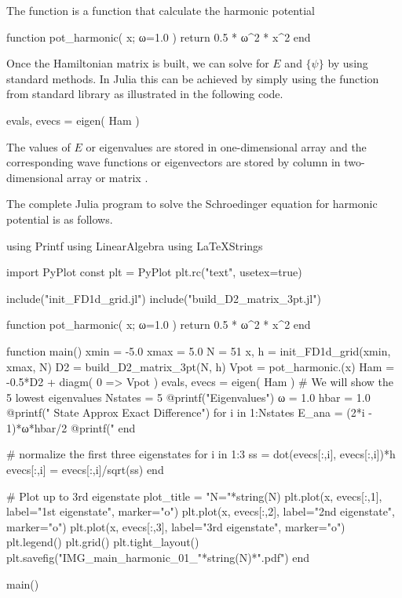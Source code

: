 The function  is a function that calculate the harmonic potential
\begin{juliacode}
function pot_harmonic( x; ω=1.0 )
  return 0.5 * ω^2 * x^2
end
\end{juliacode}

Once the Hamiltonian matrix is built, we can solve for $E$ and $\{\psi\}$ by using standard
methods. In Julia this can be achieved by simply using the  function
from  standard library as illustrated in the following code.
\begin{juliacode}
evals, evecs = eigen( Ham )
\end{juliacode}
The values of $E$ or eigenvalues are stored in one-dimensional array 
and the corresponding wave functions or eigenvectors are stored by column in two-dimensional
array or matrix .

The complete Julia program to solve the Schroedinger equation for harmonic potential
is as follows.

\begin{juliacode}
using Printf
using LinearAlgebra
using LaTeXStrings
  
import PyPlot
const plt = PyPlot
plt.rc("text", usetex=true)

include("init_FD1d_grid.jl")
include("build_D2_matrix_3pt.jl")
  
function pot_harmonic( x; ω=1.0 )
  return 0.5 * ω^2 * x^2
end
  
function main()
  xmin = -5.0
  xmax =  5.0
  N = 51
  x, h = init_FD1d_grid(xmin, xmax, N)
  D2 = build_D2_matrix_3pt(N, h)
  Vpot = pot_harmonic.(x)
  Ham = -0.5*D2 + diagm( 0 => Vpot )
  evals, evecs = eigen( Ham )
  # We will show the 5 lowest eigenvalues
  Nstates = 5
  @printf("Eigenvalues\n")
  ω = 1.0
  hbar = 1.0
  @printf(" State         Approx              Exact          Difference\n")
  for i in 1:Nstates
    E_ana = (2*i - 1)*ω*hbar/2
    @printf("%
  end
  
  # normalize the first three eigenstates
  for i in 1:3
    ss = dot(evecs[:,i], evecs[:,i])*h
    evecs[:,i] = evecs[:,i]/sqrt(ss)
  end
  
  # Plot up to 3rd eigenstate
  plot_title = "N="*string(N)
  plt.plot(x, evecs[:,1], label="1st eigenstate", marker="o")
  plt.plot(x, evecs[:,2], label="2nd eigenstate", marker="o")
  plt.plot(x, evecs[:,3], label="3rd eigenstate", marker="o")
  plt.legend()
  plt.grid()
  plt.tight_layout()
  plt.savefig("IMG_main_harmonic_01_"*string(N)*".pdf")
end

main()
\end{juliacode}

